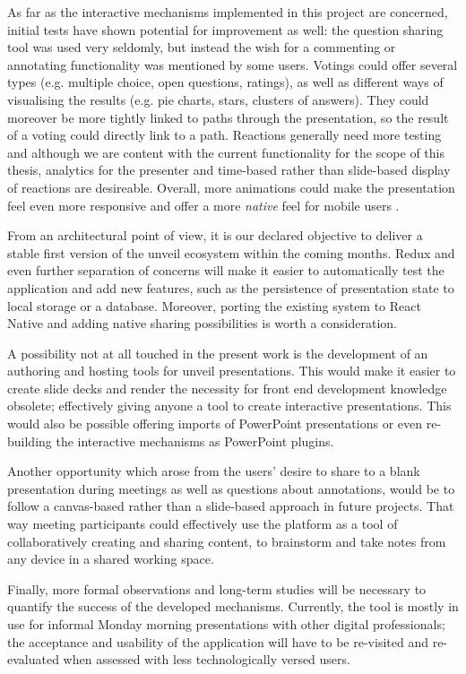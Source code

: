 As far as the interactive mechanisms implemented in this project are concerned, initial tests have shown potential for improvement as well: the question sharing tool was used very seldomly, but instead the wish for a commenting or annotating functionality was mentioned by some users. Votings could offer several types (e.g. multiple choice, open questions, ratings), as well as different ways of visualising the results (e.g. pie charts, stars, clusters of answers). They could moreover be more tightly linked to paths through the presentation, so the result of a voting could directly link to a path.
Reactions generally need more testing and although we are content with the current functionality for the scope of this thesis, analytics for the presenter and time-based rather than slide-based display of reactions are desireable.
Overall, more animations could make the presentation feel even more responsive and offer a more \emph{native} feel for mobile users \cite{GoogleMaterialDesignGuide}.

From an architectural point of view, it is our declared objective to deliver a stable first version of the unveil ecosystem within the coming months. Redux and even further separation of concerns will make it easier to automatically test the application and add new features, such as the persistence of presentation state to local storage or a database. Moreover, porting the existing system to React Native and adding native sharing possibilities is worth a consideration.

A possibility not at all touched in the present work is the development of an authoring and hosting tools for unveil presentations. This would make it easier to create slide decks and render the necessity for front end development knowledge obsolete; effectively giving anyone a tool to create interactive presentations. This would also be possible offering imports of PowerPoint presentations or even re-building the interactive mechanisms as PowerPoint plugins.

Another opportunity which arose from the users' desire to share to a blank presentation during meetings as well as questions about annotations, would be to follow a canvas-based rather than a slide-based approach in future projects. That way meeting participants could effectively use the platform as a tool of collaboratively creating and sharing content, to brainstorm and take notes from any device in a shared working space.

Finally, more formal observations and long-term studies will be necessary to quantify the success of the developed mechanisms. Currently, the tool is mostly in use for informal Monday morning presentations with other digital professionals; the acceptance and usability of the application will have to be re-visited and re-evaluated when assessed with less technologically versed users.